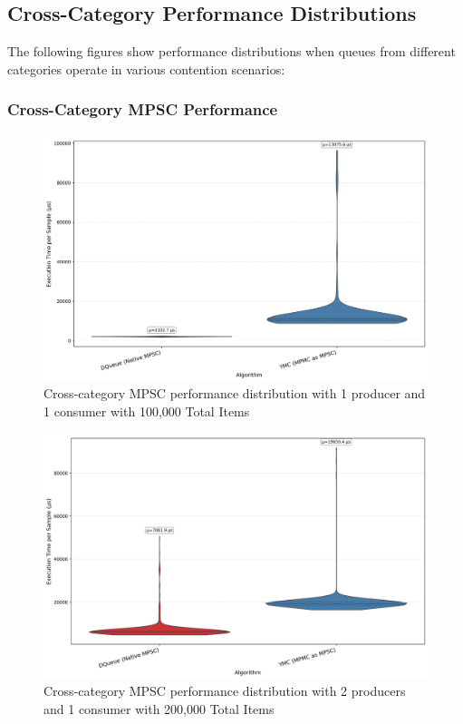 \subsection{Cross-Category Performance Distributions}
The following figures show performance distributions when queues from different categories operate in various contention scenarios:

\subsubsection{Cross-Category MPSC Performance}
\begin{figure}[H]
\centering
\caption{Cross-category MPSC performance distribution with 1 producer and 1 consumer with 100,000 Total Items}
\label{fig:cross-mpsc-violin-1p}
\includegraphics[width=\textwidth]{images/results/best_in_mpsc_performance_violin_1P1C.png}
\end{figure}

\begin{figure}[H]
\centering
\caption{Cross-category MPSC performance distribution with 2 producers and 1 consumer with 200,000 Total Items}
\label{fig:cross-mpsc-violin-2p}
\includegraphics[width=\textwidth]{images/results/best_in_mpsc_performance_violin_2P1C.png}
\end{figure}

